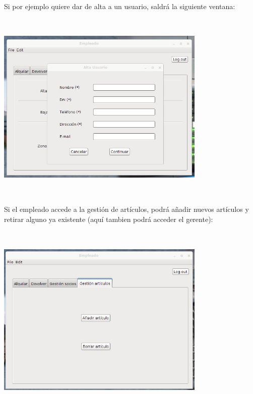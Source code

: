 Si por ejemplo quiere dar de alta a un usuario, saldrá la siguiente ventana:\\
\includegraphics[width=10cm, height=10cm, keepaspectratio]{img/altasocio.jpg}\\

Si el empleado accede a la gestión de artículos, podrá añadir nuevos artículos y retirar alguno ya existente (aquí tambien podrá acceder el gerente):\\
\includegraphics[width=10cm, height=10cm, keepaspectratio]{img/empleado-articulos.jpg}
\clearpage

